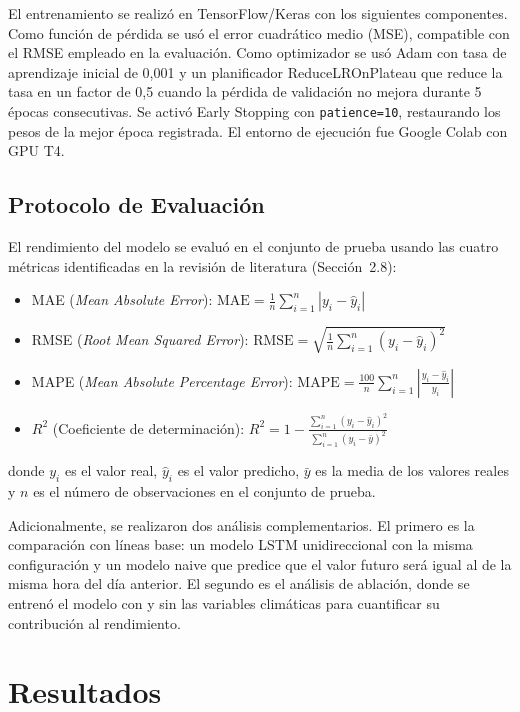 \documentclass[preprint,12pt]{elsarticle}
\begin{document}
El entrenamiento se realizó en TensorFlow/Keras con los siguientes componentes. Como función de pérdida se usó el error cuadrático medio (MSE), compatible con el RMSE empleado en la evaluación. Como optimizador se usó Adam con tasa de aprendizaje inicial de 0,001 y un planificador ReduceLROnPlateau que reduce la tasa en un factor de 0,5 cuando la pérdida de validación no mejora durante 5 épocas consecutivas. Se activó Early Stopping con \texttt{patience=10}, restaurando los pesos de la mejor época registrada. El entorno de ejecución fue Google Colab con GPU T4.

\subsection{Protocolo de Evaluación}

El rendimiento del modelo se evaluó en el conjunto de prueba usando las cuatro métricas identificadas en la revisión de literatura (Sección~2.8):

\begin{itemize}
    \item MAE (\textit{Mean Absolute Error}): $\text{MAE} = \frac{1}{n} \sum_{i=1}^{n} |y_i - \hat{y}_i|$
    \item RMSE (\textit{Root Mean Squared Error}): $\text{RMSE} = \sqrt{\frac{1}{n} \sum_{i=1}^{n} (y_i - \hat{y}_i)^2}$
    \item MAPE (\textit{Mean Absolute Percentage Error}): $\text{MAPE} = \frac{100}{n} \sum_{i=1}^{n} \left|\frac{y_i - \hat{y}_i}{y_i}\right|$
    \item $R^2$ (Coeficiente de determinación): $R^2 = 1 - \frac{\sum_{i=1}^{n}(y_i - \hat{y}_i)^2}{\sum_{i=1}^{n}(y_i - \bar{y})^2}$
\end{itemize}

donde $y_i$ es el valor real, $\hat{y}_i$ es el valor predicho, $\bar{y}$ es la media de los valores reales y $n$ es el número de observaciones en el conjunto de prueba.

Adicionalmente, se realizaron dos análisis complementarios. El primero es la comparación con líneas base: un modelo LSTM unidireccional con la misma configuración y un modelo naive que predice que el valor futuro será igual al de la misma hora del día anterior. El segundo es el análisis de ablación, donde se entrenó el modelo con y sin las variables climáticas para cuantificar su contribución al rendimiento.


\section{Resultados}
\end{document}

